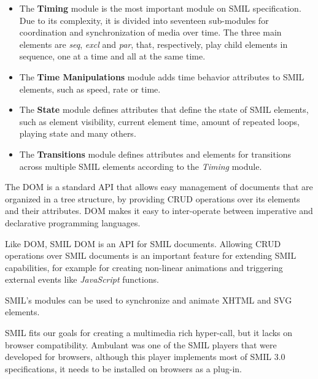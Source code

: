 \begin{itemize}
  \item The \textbf{Timing} module is the most important module on \ac{SMIL} specification. Due to its complexity, it is divided into seventeen sub-modules for coordination and synchronization of media over time. The three main elements are \emph{seq}, \emph{excl} and \emph{par}, that, respectively, play child elements in sequence, one at a time and all at the same time. 

  \item The \textbf{Time Manipulations} module adds time behavior attributes to \ac{SMIL} elements, such as speed, rate or time.

  \item The \textbf{State} module defines attributes that define the state of \ac{SMIL} elements, such as element visibility, current element time, amount of repeated loops, playing state and many others.

  \item The \textbf{Transitions} module defines attributes and elements for transitions across multiple \ac{SMIL} elements according to the \emph{Timing} module.

\end{itemize}

The \ac{DOM} is a standard \ac{API} that allows easy management of documents that are organized in a tree structure, by providing \ac{CRUD} operations over its elements and their attributes. \ac{DOM} makes it easy to inter-operate between imperative and declarative programming languages\cite{dom}.

Like \ac{DOM}, \ac{SMIL} \ac{DOM} is an \ac{API} for \ac{SMIL} documents. Allowing \ac{CRUD} operations over \ac{SMIL} documents is an important feature for extending \ac{SMIL} capabilities, for example for creating non-linear animations and triggering external events like \emph{JavaScript} functions.  


  \ac{SMIL}'s modules can be used to synchronize and animate \ac{XHTML} and \ac{SVG} elements.
  
  \ac{SMIL} fits our goals for creating a multimedia rich hyper-call, but it lacks on browser compatibility. Ambulant \cite{ambulant} was one of the SMIL players that were developed for browsers, although this player implements most of \ac{SMIL} 3.0 \cite{smil3} specifications, it needs to be installed on browsers as a plug-in.

